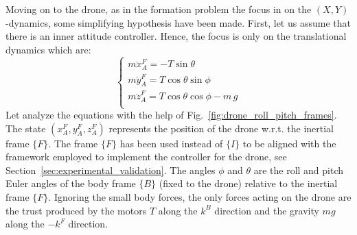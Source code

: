 \documentclass{ifacconf}
\begin{document}
Moving on to the drone, as in the formation problem the focus in 
on the $(X,Y)$-dynamics, some simplifying hypothesis have been made.
First, let us assume that there is an inner attitude controller.
Hence, the focus is only on the translational dynamics which are:
\begin{equation}
    \begin{cases}
        m\ddot{x}^F_A = - T \sin \theta \\
        m\ddot{y}^F_A = T \cos \theta \sin \phi \\
        m\ddot{z}^F_A = T \cos \theta \cos \phi  - m\, g\\
    \end{cases}
\end{equation}
Let analyze the equations with the help of Fig.~\ref{fig:drone_roll_pitch_frames}.
The state $({x}^F_A,{y}^F_A,{z}^F_A)$ represents the position of the drone w.r.t. the inertial frame $\{F\}$.
The frame $\{F\}$ has been used instead of $\{I\}$ to be aligned with the framework employed 
to implement the controller for the drone, see Section~\ref{sec:experimental_validation}.
The angles $\phi$ and $\theta$ are the roll and pitch Euler angles 
of the body frame $\{B\}$ (fixed to the drone) relative to the inertial
frame $\{F\}$.
Ignoring the small body forces, the only forces acting on the drone are 
the trust produced by the motors $T$ along the $k^B$ direction and 
the gravity $mg$ along the $-k^F$ direction.
\end{document}
